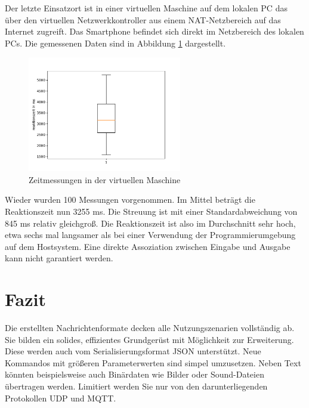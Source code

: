 \documentclass[11pt,a4paper]{report}
\begin{document}
Der letzte Einsatzort ist in einer virtuellen Maschine auf dem lokalen PC das über den virtuellen Netzwerkkontroller aus einem NAT-Netzbereich auf das Internet zugreift.
Das Smartphone befindet sich direkt im Netzbereich des lokalen PCs.
Die gemessenen Daten sind in Abbildung \ref{fig:measure_vm} dargestellt.
\begin{figure}[htbp]
  \centering
  \includegraphics[width=0.6\textwidth]{images/timing_vm}
  \caption{Zeitmessungen in der virtuellen Maschine}
  \label{fig:measure_vm}
\end{figure}
Wieder wurden 100 Messungen vorgenommen.
Im Mittel beträgt die Reaktionszeit nun 3255 ms.
Die Streuung ist mit einer Standardabweichung von 845 ms relativ gleichgroß.
Die Reaktionszeit ist also im Durchschnitt sehr hoch, etwa sechs mal langsamer als bei einer Verwendung der Programmierumgebung auf dem Hostsystem.
Eine direkte Assoziation zwischen Eingabe und Ausgabe kann nicht garantiert werden.

\chapter{Fazit}\label{chap:fazit}
Die erstellten Nachrichtenformate decken alle Nutzungszenarien vollständig ab.
Sie bilden ein solides, effizientes Grundgerüst mit Möglichkeit zur Erweiterung.
Diese werden auch vom Serialisierungsformat JSON unterstützt.
Neue Kommandos mit größeren Parameterwerten sind simpel umzusetzen.
Neben Text könnten beispielsweise auch Binärdaten wie Bilder oder Sound-Dateien übertragen werden.
Limitiert werden Sie nur von den darunterliegenden Protokollen UDP und MQTT.



\newpage
\end{document}

